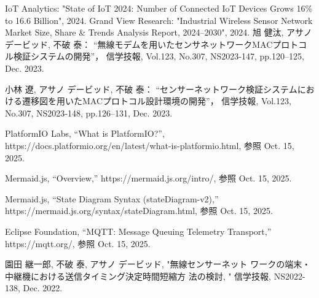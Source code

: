 \documentclass[technicalreport]{ieicej}
\begin{document}
%
%

\begin{thebibliography}{99}
 IoT Analytics: "State of IoT 2024: Number of Connected IoT Devices Grows 16\% to 16.6 Billion", 2024.  
 Grand View Research: "Industrial Wireless Sensor Network Market Size, Share \& Trends Analysis Report, 2024–2030", 2024.
旭 健汰, アサノ デービッド, 不破 泰：  
“無線モデムを用いたセンサネットワークMACプロトコル検証システムの開発”，  
信学技報, Vol.123, No.307, NS2023‑147, pp.120–125, Dec. 2023.

小林 遼, アサノ デービッド, 不破 泰：  
“センサーネットワーク検証システムにおける遷移図を用いたMACプロトコル設計環境の開発”，  
信学技報, Vol.123, No.307, NS2023‑148, pp.126–131, Dec. 2023.  

PlatformIO Labs, “What is PlatformIO?”, 
https://docs.platformio.org/en/latest/what-is-platformio.html, 参照 Oct. 15, 2025.

Mermaid.js, “Overview,” 
https://mermaid.js.org/intro/, 参照 Oct. 15, 2025.

Mermaid.js, “State Diagram Syntax (stateDiagram-v2),” 
https://mermaid.js.org/syntax/stateDiagram.html, 参照 Oct. 15, 2025.

Eclipse Foundation, “MQTT: Message Queuing Telemetry Transport,” 
https://mqtt.org/, 参照 Oct. 15, 2025.

 園田 継一郎, 不破 泰, アサノ デービッド, "無線センサーネット
ワークの端末・中継機における送信タイミング決定時間短縮方
法の検討, " 信学技報, NS2022-138, Dec. 2022.
\end{thebibliography}
\end{document}
